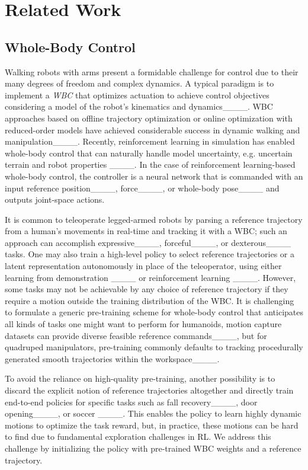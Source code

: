 \section{Related Work}
\label{sec:related_work}

\subsection{Whole-Body Control} 
Walking robots with arms present a formidable challenge for control due to their many degrees of freedom and complex dynamics. A typical paradigm is to implement a \textit{WBC} that optimizes actuation to achieve control objectives considering a model of the robot's kinematics and dynamics____. WBC approaches based on offline trajectory optimization or online optimization with reduced-order models have achieved considerable success in dynamic walking and manipulation____. 
Recently, reinforcement learning in simulation has enabled whole-body control that can naturally handle model uncertainty, e.g. uncertain terrain and robot properties ____. 
In the case of reinforcement learning-based whole-body control, the controller is a neural network that is commanded with an input reference position____, force____, or whole-body pose____ and outputs joint-space actions.  

It is common to teleoperate legged-armed robots by parsing a reference trajectory from a human's movements in real-time and tracking it with a WBC; such an approach can accomplish expressive____, forceful____, or dexterous____ tasks. 
One may also train a high-level policy to select reference trajectories or a latent representation autonomously in place of the teleoperator, using either learning from demonstration ____ or reinforcement learning ____. 
However, some tasks may not be achievable by any choice of reference trajectory if they require a motion outside the training distribution of the WBC. 
It is challenging to formulate a generic pre-training scheme for whole-body control that anticipates all kinds of tasks one might want to perform  
for humanoids, motion capture datasets can provide diverse feasible reference commands____, but for quadruped manipulators, pre-training commonly defaults 
to tracking procedurally generated smooth trajectories within the workspace____. 

To avoid the reliance on high-quality pre-training, another possibility is to discard the explicit notion of reference trajectories altogether and directly train end-to-end policies for specific tasks such as fall recovery____, door opening____, or soccer ____. This enables the policy to learn highly dynamic motions to optimize the task reward, but, in practice, these motions can be hard to find due to fundamental exploration challenges in RL. We address this challenge by initializing the policy with pre-trained WBC weights and a reference trajectory.

